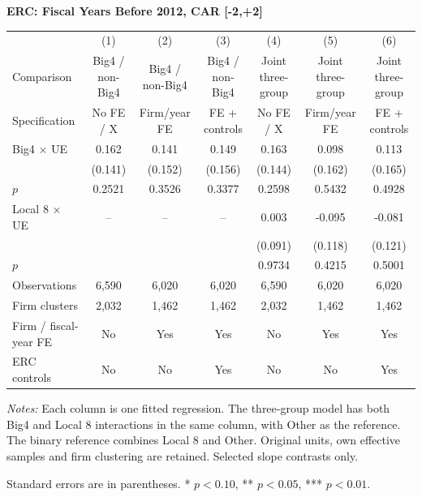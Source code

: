 \documentclass[10pt]{article}
\begin{document}
\begin{minipage}{23.60cm}
\fontsize{10}{12}\selectfont
\setlength{\tabcolsep}{4pt}\renewcommand{\arraystretch}{1.08}
{\large\bfseries ERC: Fiscal Years Before 2012, CAR [-2,+2]}\par\medskip
\begin{tabular*}{\linewidth}{@{\extracolsep{\fill}}lcccccc@{}}
\toprule
 & (1) & (2) & (3) & (4) & (5) & (6) \\
Comparison & Big4 / non-Big4 & Big4 / non-Big4 & Big4 / non-Big4 & Joint three-group & Joint three-group & Joint three-group \\
Specification & No FE / X & Firm/year FE & FE + controls & No FE / X & Firm/year FE & FE + controls \\
\midrule
Big4 $\times$ UE & 0.162 & 0.141 & 0.149 & 0.163 & 0.098 & 0.113 \\
 & (0.141) & (0.152) & (0.156) & (0.144) & (0.162) & (0.165) \\
$p$ & 0.2521 & 0.3526 & 0.3377 & 0.2598 & 0.5432 & 0.4928 \\
Local 8 $\times$ UE & -- & -- & -- & 0.003 & -0.095 & -0.081 \\
 &  &  &  & (0.091) & (0.118) & (0.121) \\
$p$ &  &  &  & 0.9734 & 0.4215 & 0.5001 \\
\midrule
Observations & 6,590 & 6,020 & 6,020 & 6,590 & 6,020 & 6,020 \\
Firm clusters & 2,032 & 1,462 & 1,462 & 2,032 & 1,462 & 1,462 \\
Firm / fiscal-year FE & No & Yes & Yes & No & Yes & Yes \\
ERC controls & No & No & Yes & No & No & Yes \\
\bottomrule\end{tabular*}\par\medskip
\fontsize{9}{11}\selectfont\textit{Notes:} Each column is one fitted regression. The three-group model has both Big4 and Local 8 interactions in the same column, with Other as the reference. The binary reference combines Local 8 and Other. Original units, own effective samples and firm clustering are retained. Selected slope contrasts only.
\par Standard errors are in parentheses. * $p<0.10$, ** $p<0.05$, *** $p<0.01$.
\end{minipage}
\end{document}
